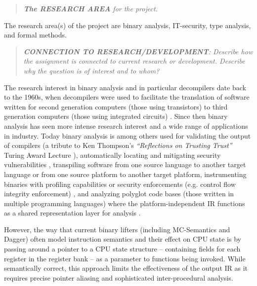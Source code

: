 \documentclass[12pt, a4paper]{article}
\begin{document}


\begin{quote}
	\textit{\textbf{The RESEARCH AREA} for the project.}
\end{quote}

The research area(s) of the project are binary analysis, IT-security, type analysis, and formal methods.

\begin{quote}
	\textit{\textbf{CONNECTION TO RESEARCH/DEVELOPMENT}: Describe how the assignment is connected to current research or development. Describe why the question is of interest and to whom?}
\end{quote}

The research interest in binary analysis and in particular decompilers date back to the 1960s, when decompilers were used to facilitate the translation of software written for second generation computers (those using transistors) to third generation computers (those using integrated circuits) \cite{reverse_compilation}. Since then binary analysis has seen more intense research interest and a wide range of applications in industry. Today binary analysis is among others used for validating the output of compilers (a tribute to Ken Thompson's \textit{``Reflections on Trusting Trust''} Turing Award Lecture \cite{trusting_trust}), automatically locating and mitigating security vulnerabilities \cite{state_of_the_art_of_war}, transpiling software from one source language to another target language or from one source platform to another target platform, instrumenting binaries with profiling capabilities or security enforcements (e.g. control flow integrity enforcement) \cite{superset_disassembly}, and analyzing polyglot code bases (those written in multiple programming languages) where the platform-independent IR functions as a shared representation layer for analysis \cite{revgen}.

However, the way that current binary lifters (including MC-Semantics and Dagger) often model instruction semantics and their effect on CPU state is by passing around a pointer to a CPU state structure -- containing fields for each register in the register bank -- as a parameter to functions being invoked. While semantically correct, this approach limits the effectiveness of the output IR as it requires precise pointer aliasing and sophisticated inter-procedural analysis.
\end{document}
